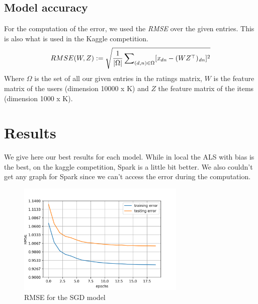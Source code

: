 \documentclass[a4paper]{article}
\begin{document}
\subsection{Model accuracy}
For the computation of the error, we used the \textit{RMSE} over the given entries. This is also what is used in the Kaggle competition.  
$$ RMSE(W, Z) := \sqrt{\frac{1}{|\Omega|} \sum\nolimits_{(d, n) \in \Omega} [\textit{x\textsubscript{dn}} - (WZ^\top)\textsubscript{\textit{dn}}]^2} $$
Where \(\Omega\) is the set of all our given entries in the ratings matrix, \(W\) is the feature matrix of the users (dimension 10000 x K) and \(Z\) the feature matrix of the items (dimension 1000 x K).






\section{Results}
We give here our best results for each model.
While in local the ALS with bias is the best, on the kaggle competition, Spark is a little bit better. We also couldn't get any graph for Spark since we can't access the error during the computation.
\mbox{}\\
\begin{figure}[h]
  \centering
  \includegraphics[width=8cm]{RMSE_SGD.png}
  \caption{RMSE for the SGD model}
  \label{fig:figure 2}
\end{figure}

\mbox{}\\
\end{document}

